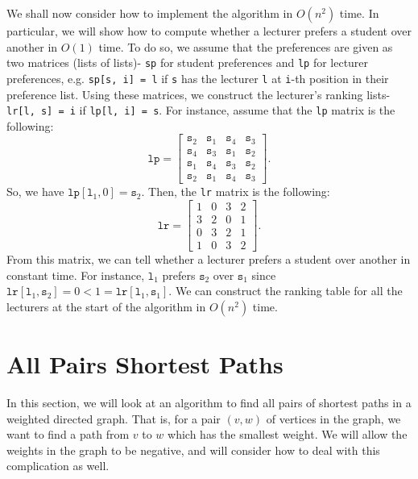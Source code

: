 \documentclass[a4paper, openany]{memoir}
\begin{document}
    We shall now consider how to implement the algorithm in $O(n^2)$ time. In particular, we will show how to compute whether a lecturer prefers a student over another in $O(1)$ time. To do so, we assume that the preferences are given as two matrices (lists of lists)- \texttt{sp} for student preferences and \texttt{lp} for lecturer preferences, e.g. \texttt{sp[s, i] = l} if \texttt{s} has the lecturer \texttt{l} at \texttt{i}-th position in their preference list. Using these matrices, we construct the lecturer's ranking lists- \texttt{lr[l, s] = i} if \texttt{lp[l, i] = s}. For instance, assume that the \texttt{lp} matrix is the following:
    \[\texttt{lp} = \begin{bmatrix}
        \texttt{s}_2 & \texttt{s}_1 & \texttt{s}_4 & \texttt{s}_3 \\
        \texttt{s}_4 & \texttt{s}_3 & \texttt{s}_1 & \texttt{s}_2 \\
        \texttt{s}_1 & \texttt{s}_4 & \texttt{s}_3 & \texttt{s}_2 \\
        \texttt{s}_2 & \texttt{s}_1 & \texttt{s}_4 & \texttt{s}_3
    \end{bmatrix}.\]
    So, we have $\texttt{lp}[\texttt{l}_1, 0] = \texttt{s}_2$. Then, the \texttt{lr} matrix is the following:
    \[\texttt{lr} = \begin{bmatrix}
        1 & 0 & 3 & 2 \\
        3 & 2 & 0 & 1 \\
        0 & 3 & 2 & 1 \\
        1 & 0 & 3 & 2
    \end{bmatrix}.\]
    From this matrix, we can tell whether a lecturer prefers a student over another in constant time. For instance, $\texttt{l}_1$ prefers $\texttt{s}_2$ over $\texttt{s}_1$ since $\texttt{lr}[\texttt{l}_1, \texttt{s}_2] = 0 < 1 = \texttt{lr}[\texttt{l}_1, \texttt{s}_1]$. We can construct the ranking table for all the lecturers at the start of the algorithm in $O(n^2)$ time.

    \newpage

    \section{All Pairs Shortest Paths}
    In this section, we will look at an algorithm to find all pairs of shortest paths in a weighted directed graph. That is, for a pair $(v, w)$ of vertices in the graph, we want to find a path from $v$ to $w$ which has the smallest weight. We will allow the weights in the graph to be negative, and will consider how to deal with this complication as well.
\end{document}
